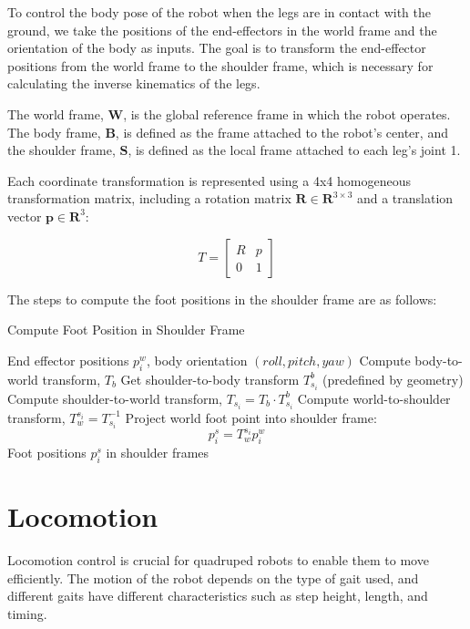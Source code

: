 \documentclass[a4paper,11pt]{article}
\begin{document}
To control the body pose of the robot when the legs are in contact with the ground, we take
the positions of the end-effectors in the world frame and the orientation of the body as inputs.
The goal is to transform the end-effector positions from the world frame to the shoulder frame, which is necessary for
calculating the inverse kinematics of the legs.

The world frame, $\boldsymbol{W}$, is the global reference frame in which the robot operates. 
The body frame, $\boldsymbol{B}$, is defined as the frame attached to the robot's center, and 
the shoulder frame, $\boldsymbol{S}$, is defined as the local frame attached to each leg's joint 1.

Each coordinate transformation is represented using a 4x4 homogeneous transformation matrix, including a rotation matrix $\mathbf{R} \in \mathbf{R}^{3 \times 3}$
and a translation vector $\mathbf{p} \in \mathbf{R}^{3}$:

$$
T = \begin{bmatrix}
R & p \\
0 & 1
\end{bmatrix}
$$

The steps to compute the foot positions in the shoulder frame are as follows:

\begin{algorithm}[H]
\caption{Compute Foot Position in Shoulder Frame}
\begin{algorithmic}[1]
\Require End effector positions $p^w_i$, body orientation $(roll, pitch, yaw)$
\State Compute body-to-world transform, $T_b$
    \State Get shoulder-to-body transform $T_{s_i}^b$ (predefined by geometry)
    \State Compute shoulder-to-world transform, $T_{s_i} = T_b \cdot T_{s_i}^b$
    \State Compute world-to-shoulder transform, $T_w^{s_i} = T_{s_i}^{-1}$
    \State Project world foot point into shoulder frame:
    $$
    p_i^s = T_w^{s_i} p_i^w
    $$
\EndFor
\State \Return Foot positions $p_i^s$ in shoulder frames
\end{algorithmic}
\end{algorithm}

\section*{Locomotion}

Locomotion control is crucial for quadruped robots to enable them to move efficiently. The motion of the robot depends on the type of gait used, and different gaits have different characteristics such as step height, length, and timing.
\end{document}
